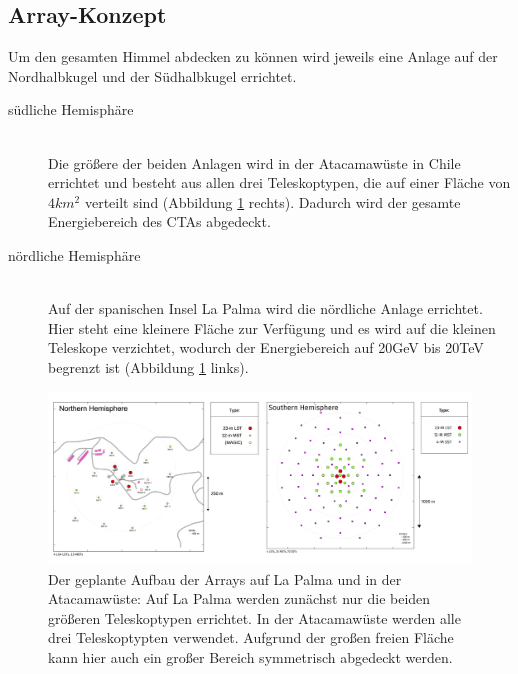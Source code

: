 \subsection{Array-Konzept}
Um den gesamten Himmel abdecken zu können wird jeweils eine Anlage auf der Nordhalbkugel und der Südhalbkugel errichtet.
\begin{description}
\item[südliche Hemisphäre]\hfill \\
Die größere der beiden Anlagen wird in der Atacamawüste in Chile errichtet und besteht aus allen drei Teleskoptypen, die auf einer Fläche von $4\unit{km^2}$ verteilt sind (Abbildung \ref{img:ArrayLayout} rechts). Dadurch wird der gesamte Energiebereich des CTAs abgedeckt.
\item[nördliche Hemisphäre]\hfill \\ 
Auf der spanischen Insel La Palma wird die nördliche Anlage errichtet. Hier steht eine kleinere Fläche zur Verfügung und es wird auf die kleinen Teleskope verzichtet, wodurch der Energiebereich auf 20GeV bis 20TeV begrenzt ist (Abbildung \ref{img:ArrayLayout} links).
\end{description}

\begin{figure}[htbp]
\centering
\includegraphics[width=\textwidth]{Images/ArrayLayout.png}
\caption{Der geplante Aufbau der Arrays auf La Palma und in der Atacamawüste: Auf La Palma werden zunächst nur die beiden größeren Teleskoptypen errichtet. In der Atacamawüste werden alle drei Teleskoptypten verwendet. Aufgrund der großen freien Fläche kann hier auch ein großer Bereich symmetrisch abgedeckt werden.\cite{Flickr}}
\label{img:ArrayLayout}
\end{figure}

